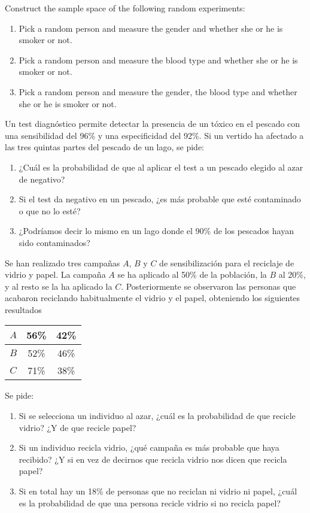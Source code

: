 {Construct the sample space of the following random experiments:
\begin{enumerate}
\item Pick a random person and measure the gender and whether she or he is smoker or not. 
\item Pick a random person and measure the blood type and whether she or he is smoker or not.
\item Pick a random person and measure the gender, the blood type and whether she or he is smoker or not.
\end{enumerate}
}
{}
{}


{Un test diagnóstico permite detectar la presencia de un tóxico en el pescado con una sensibilidad del 96\% y una especificidad del 92\%. Si un vertido ha afectado a las tres quintas partes del pescado de un lago, se pide:
\begin{enumerate}
\item ¿Cuál es la probabilidad de que al aplicar el test a un pescado  elegido al azar de negativo?
\item Si el test da negativo en un pescado, ¿es más probable que esté contaminado o que no lo esté?
\item ¿Podríamos decir lo mismo en un lago donde el 90\% de los pescados hayan sido contaminados?
\end{enumerate}
}
{}
{}


{Se han realizado tres campañas $A$, $B$ y $C$ de sensibilización para el reciclaje de vidrio y papel. La campaña $A$ se ha aplicado al 50\% de la población, la $B$ al 20\%, y al resto se la ha aplicado la $C$. Posteriormente se observaron las personas que acabaron reciclando habitualmente el vidrio y el papel, obteniendo los siguientes resultados
\begin{center}
\begin{tabular}{|c|c|c|}
\hline
$A$ & 56\% & 42\% \\
\hline
$B$ & 52\% & 46\% \\
\hline
$C$ & 71\% & 38\% \\
\hline
\end{tabular}
\end{center}
Se pide:
\begin{enumerate}
\item Si se selecciona un individuo al azar, ¿cuál es la probabilidad de que recicle vidrio? ¿Y de que recicle papel?
\item Si un individuo recicla vidrio, ¿qué campaña es más probable que haya recibido? ¿Y si en vez de decirnos que recicla vidrio nos dicen que recicla papel?
\item Si en total hay un 18\% de personas que no reciclan ni vidrio ni papel, ¿cuál es la probabilidad de que una persona recicle vidrio si no recicla papel?
\end{enumerate}
}
{}
{}


